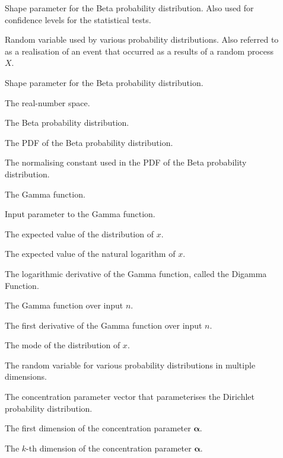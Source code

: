 \begin{description}
	\item [\parbox{2cm}{$\alpha$}] Shape parameter for the Beta probability distribution. Also used for confidence levels for the statistical tests.
	\item [\parbox{2cm}{$x$}] Random variable used by various probability distributions. Also referred to as a realisation of an event that occurred as a results of a random process $X$.
	\item [\parbox{2cm}{$\beta$}] Shape parameter for the Beta probability distribution.
	\item [\parbox{2cm}{$\mathbb{R}$}] The real-number space.
	\item [\parbox{2cm}{$Beta$}] The Beta probability distribution.
	\item [\parbox{2cm}{$f_{Beta}$}] The \acs{PDF} of the Beta probability distribution.
	\item [\parbox{2cm}{$B(\alpha, \beta)$}] The normalising constant used in the \acs{PDF} of the Beta probability distribution.
	\item [\parbox{2cm}{$\Gamma$}] The Gamma function.
	\item [\parbox{2cm}{$n$}] Input parameter to the Gamma function.
	\item [\parbox{2cm}{$E[x]$}] The expected value of the distribution of $x$.
	\item [\parbox{2cm}{$E[\ln(x)]$}] The expected value of the natural logarithm of $x$.
	\item [\parbox{2cm}{$\psi$}] The logarithmic derivative of the Gamma function, called the Digamma Function.
	\item [\parbox{2cm}{$\Gamma(n)$}] The Gamma function over input $n$.
	\item [\parbox{2cm}{$\Gamma'(n)$}] The first derivative of the Gamma function over input $n$.
	\item [\parbox{2cm}{$M[x]$}] The mode of the distribution of $x$.
	\item [\parbox{2cm}{$\boldsymbol{x}$}] The random variable for various probability distributions in multiple dimensions.
	\item [\parbox{2cm}{$\boldsymbol{\alpha}$}] The concentration parameter vector that parameterises the Dirichlet probability distribution.
	\item [\parbox{2cm}{$\alpha_{1}$}] The first dimension of the concentration parameter $\boldsymbol{\alpha}$.
	\item [\parbox{2cm}{$\alpha_{k}$}] The $k$-th dimension of the concentration parameter $\boldsymbol{\alpha}$.

\end{description}
